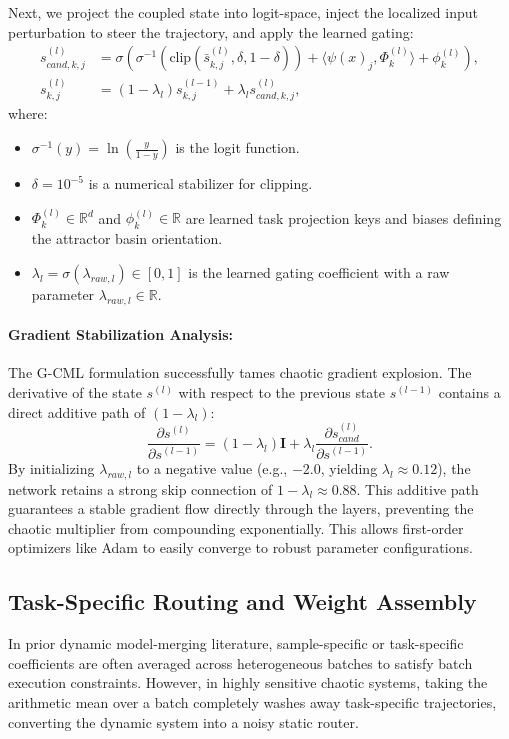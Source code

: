 Next, we project the coupled state into logit-space, inject the localized input perturbation to steer the trajectory, and apply the learned gating:
\begin{align}
s_{cand, k, j}^{(l)} &= \sigma\left( \sigma^{-1}\left( \text{clip}\left(\bar{s}_{k, j}^{(l)}, \delta, 1-\delta\right) \right) + \langle \psi(x)_j, \Phi_k^{(l)} \rangle + \phi_k^{(l)} \right), \\
s_{k, j}^{(l)} &= (1 - \lambda_l) s_{k, j}^{(l-1)} + \lambda_l s_{cand, k, j}^{(l)},
\end{align}
where:
\begin{itemize}
    \item $\sigma^{-1}(y) = \ln\left(\frac{y}{1-y}\right)$ is the logit function.
    \item $\delta = 10^{-5}$ is a numerical stabilizer for clipping.
    \item $\Phi_k^{(l)} \in \mathbb{R}^d$ and $\phi_k^{(l)} \in \mathbb{R}$ are learned task projection keys and biases defining the attractor basin orientation.
    \item $\lambda_l = \sigma(\lambda_{raw, l}) \in [0, 1]$ is the learned gating coefficient with a raw parameter $\lambda_{raw, l} \in \mathbb{R}$.
\end{itemize}

\paragraph{Gradient Stabilization Analysis:}
The G-CML formulation successfully tames chaotic gradient explosion. The derivative of the state $s^{(l)}$ with respect to the previous state $s^{(l-1)}$ contains a direct additive path of $(1 - \lambda_l)$:
\begin{equation}
\frac{\partial s^{(l)}}{\partial s^{(l-1)}} = (1 - \lambda_l)\mathbf{I} + \lambda_l \frac{\partial s_{cand}^{(l)}}{\partial s^{(l-1)}}.
\end{equation}
By initializing $\lambda_{raw, l}$ to a negative value (e.g., $-2.0$, yielding $\lambda_l \approx 0.12$), the network retains a strong skip connection of $1 - \lambda_l \approx 0.88$. This additive path guarantees a stable gradient flow directly through the layers, preventing the chaotic multiplier from compounding exponentially. This allows first-order optimizers like Adam to easily converge to robust parameter configurations.

\subsection{Task-Specific Routing and Weight Assembly}
In prior dynamic model-merging literature, sample-specific or task-specific coefficients are often averaged across heterogeneous batches to satisfy batch execution constraints. However, in highly sensitive chaotic systems, taking the arithmetic mean over a batch completely washes away task-specific trajectories, converting the dynamic system into a noisy static router.

